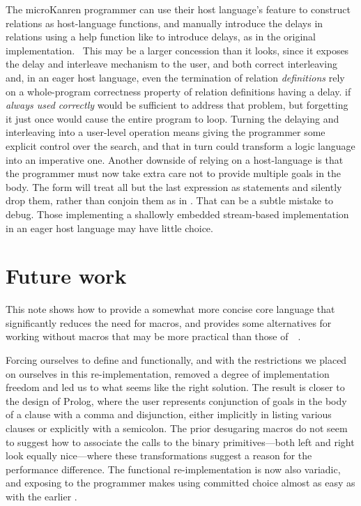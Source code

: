 \documentclass[sigplan,balance=true,pbalance=true,natbib=false]{acmart}
\begin{document}
The microKanren programmer can use their host
language's  feature to construct relations as
host-language functions, and manually introduce the delays in
relations using a help function like  to introduce
delays, as in the original implementation.~\cite{hemann2013muKanren}
This may be a larger concession than it looks, since it exposes the
delay and interleave mechanism to the user, and both correct
interleaving and, in an eager host language, even the termination of
relation \emph{definitions} rely on a whole-program correctness
property of relation definitions having a delay.  if
\emph{always used correctly} would be sufficient to address that
problem, but forgetting it just once would cause the entire program to
loop. Turning the delaying and interleaving into a user-level
operation means giving the programmer some explicit control over the
search, and that in turn could transform a logic language into an
imperative one. Another downside of relying on a
host-language  is that the programmer must now take
extra care not to provide multiple goals in the body.
The  form will treat all but the last expression as
statements and silently drop them, rather than conjoin them as
in . That can be a subtle mistake to debug. Those
implementing a shallowly embedded stream-based implementation in an
eager host language may have little choice.

\section{Future work}\label{sec:conclusion}

This note shows how to provide a somewhat more concise core language
that significantly reduces the need for macros, and provides some
alternatives for working without macros that may be more practical
than those
of~\citeauthor{hemann2013muKanren}~\cite{hemann2013muKanren}.

Forcing ourselves to define  and 
functionally, and with the restrictions we placed on ourselves in this
re-implementation, removed a degree of implementation freedom and led
us to what seems like the right solution. The result is closer to the
design of Prolog, where the user represents conjunction of goals in
the body of a clause with a comma and disjunction, either implicitly
in listing various clauses or explicitly with a semicolon. The prior
desugaring macros do not seem to suggest how to associate the calls to
the binary primitives---both left and right look equally nice---where
these transformations suggest a reason for the performance difference.
The functional  re-implementation is now also
variadic, and exposing  to the programmer makes using
committed choice almost as easy as with the
earlier .
\end{document}
